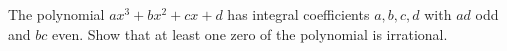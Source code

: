 The polynomial $ax^3 + bx^2 + cx + d$ has integral coefficients $a, b, c, d$ with $ad$ odd and $bc$ even. Show that at least one zero of the polynomial is irrational.
